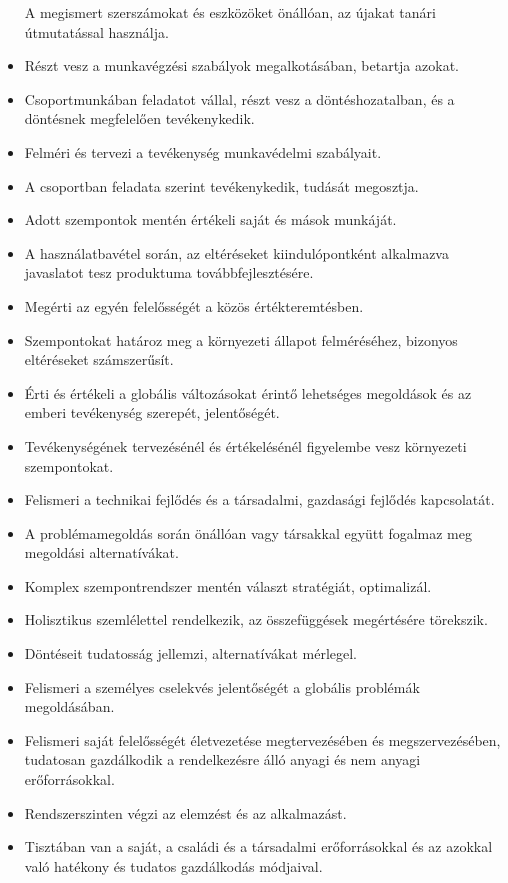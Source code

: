 \begin{itemize}
  A megismert szerszámokat és eszközöket önállóan, az újakat tanári
  útmutatással használja.
\item
  Részt vesz a munkavégzési szabályok megalkotásában, betartja azokat.
\item
  Csoportmunkában feladatot vállal, részt vesz a döntéshozatalban, és a
  döntésnek megfelelően tevékenykedik.
\item
  Felméri és tervezi a tevékenység munkavédelmi szabályait.
\item
  A csoportban feladata szerint tevékenykedik, tudását megosztja.
\item
  Adott szempontok mentén értékeli saját és mások munkáját.
\item
  A használatbavétel során, az eltéréseket kiindulópontként alkalmazva
  javaslatot tesz produktuma továbbfejlesztésére.
\item
  Megérti az egyén felelősségét a közös értékteremtésben.
\item
  Szempontokat határoz meg a környezeti állapot felméréséhez, bizonyos
  eltéréseket számszerűsít.
\item
  Érti és értékeli a globális változásokat érintő lehetséges megoldások
  és az emberi tevékenység szerepét, jelentőségét.
\item
  Tevékenységének tervezésénél és értékelésénél figyelembe vesz
  környezeti szempontokat.
\item
  Felismeri a technikai fejlődés és a társadalmi, gazdasági fejlődés
  kapcsolatát.
\item
  A problémamegoldás során önállóan vagy társakkal együtt fogalmaz meg
  megoldási alternatívákat.
\item
  Komplex szempontrendszer mentén választ stratégiát, optimalizál.
\item
  Holisztikus szemlélettel rendelkezik, az összefüggések megértésére
  törekszik.
\item
  Döntéseit tudatosság jellemzi, alternatívákat mérlegel.
\item
  Felismeri a személyes cselekvés jelentőségét a globális problémák
  megoldásában.
\item
  Felismeri saját felelősségét életvezetése megtervezésében és
  megszervezésében, tudatosan gazdálkodik a rendelkezésre álló anyagi és
  nem anyagi erőforrásokkal.
\item
  Rendszerszinten végzi az elemzést és az alkalmazást.
\item
  Tisztában van a saját, a családi és a társadalmi erőforrásokkal és az
  azokkal való hatékony és tudatos gazdálkodás módjaival.

\end{itemize}
